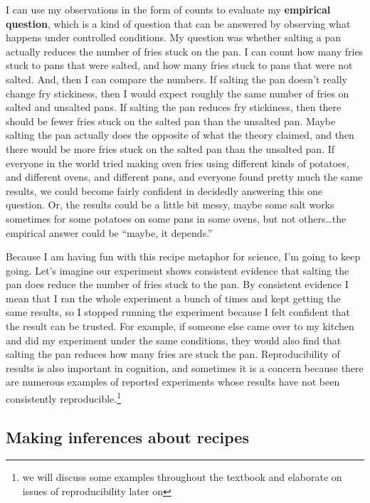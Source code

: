 \documentclass[
  oneside,
  12pt]{crumpbook}
\begin{document}
I can use my observations in the form of counts to evaluate my \textbf{empirical question}, which is a kind of question that can be answered by observing what happens under controlled conditions. My question was whether salting a pan actually reduces the number of fries stuck on the pan. I can count how many fries stuck to pans that were salted, and how many fries stuck to pans that were not salted. And, then I can compare the numbers. If salting the pan doesn't really change fry stickiness, then I would expect roughly the same number of fries on salted and unsalted pans. If salting the pan reduces fry stickiness, then there should be fewer fries stuck on the salted pan than the unsalted pan. Maybe salting the pan actually does the opposite of what the theory claimed, and then there would be more fries stuck on the salted pan than the unsalted pan. If everyone in the world tried making oven fries using different kinds of potatoes, and different ovens, and different pans, and everyone found pretty much the same results, we could become fairly confident in decidedly answering this one question. Or, the results could be a little bit messy, maybe some salt works sometimes for some potatoes on some pans in some ovens, but not others\ldots the empirical answer could be ``maybe, it depends.''

Because I am having fun with this recipe metaphor for science, I'm going to keep going. Let's imagine our experiment shows consistent evidence that salting the pan does reduce the number of fries stuck to the pan. By consistent evidence I mean that I ran the whole experiment a bunch of times and kept getting the same results, so I stopped running the experiment because I felt confident that the result can be trusted. For example, if someone else came over to my kitchen and did my experiment under the same conditions, they would also find that salting the pan reduces how many fries are stuck the pan. Reproducibility of results is also important in cognition, and sometimes it is a concern because there are numerous examples of reported experiments whose results have not been consistently reproducible.\footnote{we will discuss some examples throughout the textbook and elaborate on issues of reproducibility later on}

\hypertarget{making-inferences-about-recipes}{%
\subsection{Making inferences about recipes}\label{making-inferences-about-recipes}}
\end{document}
